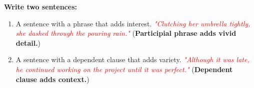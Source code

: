 \documentclass[12pt]{article}
\begin{document}
\begin{tcolorbox}[colframe=black!60, colback=white, 
coltitle=black, colbacktitle=black!15, fonttitle=\bfseries\Large, 
title=Exit Ticket, halign title=center, left=10pt, right=10pt, top=5pt, bottom=15pt]

\textbf{Write two sentences:}
\begin{enumerate}[itemsep=3em]
    \item A sentence with a phrase that adds interest.  
    \textcolor{red}{\textit{"Clutching her umbrella tightly, she dashed through the pouring rain."}} (\textbf{Participial phrase adds vivid detail.})

    \item A sentence with a dependent clause that adds variety.  
    \textcolor{red}{\textit{"Although it was late, he continued working on the project until it was perfect."}} (\textbf{Dependent clause adds context.})
\end{enumerate}

\vspace{8em}

\end{tcolorbox}
\end{document}
